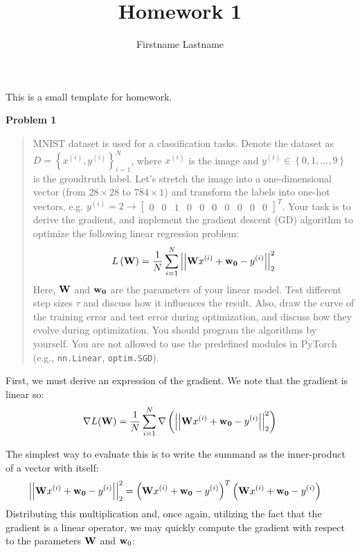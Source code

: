 \documentclass{article}
\title{Homework 1}
\author{Firstname Lastname}
\newenvironment{quotationb}%
{\begin{leftbar}\begin{quotation}\noindent}
{\end{quotation}\end{leftbar}}
\newcommand{\norm}[2]{\left|\left| #2 \right|\right|_{#1}}
\begin{document}
\maketitle


This is a small template for homework. 

\bigskip
{\Large {\bf Problem 1}}
\bigskip

\begin{quotationb}MNIST dataset is used for a classification tasks. Denote the dataset as $D = \left\{ x^{(i)}, y^{(i)}\right\}_{i=1}^{N}$, where $x^{(i)}$ is the image and $y^{(i)} \in \left\{0, 1, \dots, 9 \right\}$ is the groudtruth label. Let’s stretch the image into a one-dimensional vector (from $28 \times 28$ to $784 \times 1$) and transform the labels into one-hot vectors, e.g. $y^{(i)} = 2 \rightarrow  \begin{bmatrix}
0 & 0 & 1 & 0 & 0 & 0 & 0 & 0 & 0 & 0 \end{bmatrix}^T$. Your task is to derive the gradient, and implement the gradient descent (GD) algorithm to optimize the following linear regression problem:
$$
L\left( {\bf W} \right) = \frac{1}{N}\sum_{i=1}^{N} \norm{2}{{\bf W}x^{(i)} + {\bf w_0} - y^{(i)}}^2
$$
\noindent Here, ${\bf W}$ and ${\bf w_0}$ are the parameters of your linear model. Test different step sizes $\tau$ and discuss how it influences the result. Also, draw the curve of the training error and test error during optimization, and discuss how they evolve during optimization. You should program the algorithms by yourself. You are not allowed to use the predefined modules in PyTorch (e.g., \verb|nn.Linear|, \verb|optim.SGD|).
\end{quotationb}

First, we must derive an expression of the gradient. We note that the gradient is linear so:
$$
\nabla L({\bf W}) = \frac{1}{N} \sum_{i=1}^{N} \nabla \left( \norm{2}{{\bf W}x^{(i)} + {\bf w_0} - y^{(i)}}^2\right)
$$

The simplest way to evaluate this is to write the summand as the inner-product of a vector with itself:
$$
\begin{aligned}
\norm{2}{{\bf W}x^{(i)} + {\bf w_0} - y^{(i)}}^2 & = \left({\bf W}x^{(i)} + {\bf w_0} - y^{(i)}\right)^{T} \left({\bf W}x^{(i)} + {\bf w_0} - y^{(i)}\right)
\end{aligned}
$$
Distributing this multiplication and, once again, utilizing the fact that the gradient is a linear operator, we may quickly compute the gradient with respect to the parameters ${\bf W}$ and ${\bf w}_0$:
\end{document}
